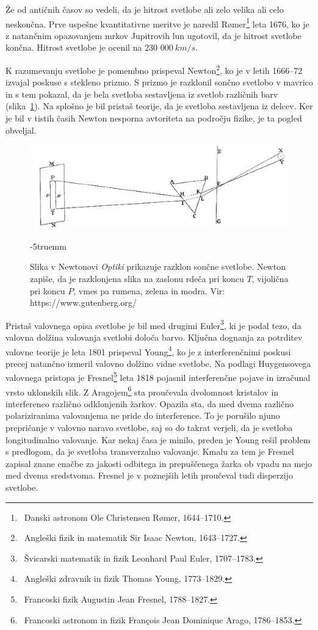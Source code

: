 Že od antičnih časov so vedeli, da
je hitrost svetlobe ali zelo velika ali celo neskončna. Prve uspešne kvantitativne
meritve je naredil R\o{}mer\footnote{~Danski astronom 
Ole Christensen R\o{}mer, 1644--1710.} leta 1676, ko je z natančnim opazovanjem 
mrkov Jupitrovih lun ugotovil, da je hitrost svetlobe končna. Hitrost svetlobe je
ocenil na $230\,\,000~\si{km/s}$.

K razumevanju svetlobe je pomembno prispeval Newton\footnote{~Angleški 
fizik in matematik Sir Isaac Newton, 1643--1727.}, ko je v letih 1666--72 
izvajal poskuse s stekleno prizmo. S prizmo je razklonil sončno svetlobo v
mavrico in s tem pokazal, da je bela svetloba sestavljena 
iz svetlob različnih barv (slika~\ref{fig:01_Newton}). Na splošno je bil pristaš teorije, da je 
svetloba sestavljena iz delcev. Ker je bil v tistih časih 
Newton nesporna avtoriteta na področju fizike, je ta pogled obveljal.
\begin{figure}[ht]
\centering
\includegraphics[width=10truecm]{slike/01_Newton.jpg}
\caption{Slika v Newtonovi {\it Optiki} prikazuje razklon sončne svetlobe. Newton 
zapiše, da je razklonjena slika na zaslonu rdeča pri koncu $T$, vijolična
pri koncu $P$, vmes pa rumena, zelena in modra. Vir: https://www.gutenberg.org/}
\label{fig:01_Newton}
\vglue-5truemm
\end{figure}

Pristaš valovnega opisa svetlobe je bil med drugimi Euler\footnote{~Švicarski 
matematik in fizik Leonhard Paul Euler, 1707--1783.}, ki je podal tezo, 
da valovna dolžina valovanja svetlobi določa barvo.
Ključna dognanja za potrditev valovne teorije je leta 1801 prispeval 
Young\footnote{~Angleški zdravnik in fizik Thomas Young, 1773--1829.}, 
ko je z interferenčnimi poskusi precej natančno izmeril valovno dolžino 
vidne svetlobe. Na podlagi Huygensovega valovnega pristopa je 
Fresnel\footnote{~Francoski fizik Augustin Jean Fresnel, 1788--1827.} 
leta 1818 pojasnil interferenčne pojave in izračunal vrsto 
uklonskih slik. Z Aragojem\footnote{~Francoski astronom in fizik
Fran\c{c}ois Jean Dominique Arago, 1786--1853.} sta proučevala 
dvolomnost kristalov in interferenco različno odklonjenih žarkov. 
Opazila sta, da med dvema različno polariziranima valovanjema ne 
pride do interference. To je porušilo njuno prepričanje v valovno 
naravo svetlobe, saj so do takrat verjeli, da je svetloba
longitudinalno valovanje. Kar nekaj časa je minilo, preden je Young 
rešil problem s predlogom, da je svetloba transverzalno valovanje.
Kmalu za tem je Fresnel zapisal znane enačbe za jakosti odbitega 
in prepuščenega žarka ob vpadu na mejo med dvema sredstvoma.
Fresnel je v poznejših letih proučeval tudi disperzijo svetlobe.

